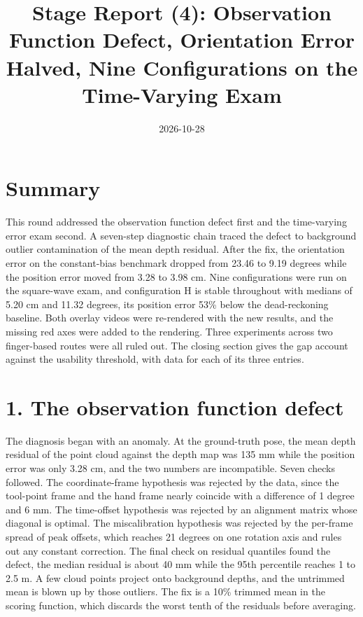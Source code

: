\documentclass{article}
\title{Stage Report (4): Observation Function Defect, Orientation Error Halved, Nine Configurations on the Time-Varying Exam}
\author{}
\date{2026-10-28}
\begin{document}
\maketitle

\section{Summary}
This round addressed the observation function defect first and the time-varying error exam second. A seven-step diagnostic chain traced the defect to background outlier contamination of the mean depth residual. After the fix, the orientation error on the constant-bias benchmark dropped from 23.46 to 9.19 degrees while the position error moved from 3.28 to 3.98 cm. Nine configurations were run on the square-wave exam, and configuration H is stable throughout with medians of 5.20 cm and 11.32 degrees, its position error 53\% below the dead-reckoning baseline. Both overlay videos were re-rendered with the new results, and the missing red axes were added to the rendering. Three experiments across two finger-based routes were all ruled out. The closing section gives the gap account against the usability threshold, with data for each of its three entries.

\section{1. The observation function defect}
The diagnosis began with an anomaly. At the ground-truth pose, the mean depth residual of the point cloud against the depth map was 135 mm while the position error was only 3.28 cm, and the two numbers are incompatible. Seven checks followed. The coordinate-frame hypothesis was rejected by the data, since the tool-point frame and the hand frame nearly coincide with a difference of 1 degree and 6 mm. The time-offset hypothesis was rejected by an alignment matrix whose diagonal is optimal. The miscalibration hypothesis was rejected by the per-frame spread of peak offsets, which reaches 21 degrees on one rotation axis and rules out any constant correction. The final check on residual quantiles found the defect, the median residual is about 40 mm while the 95th percentile reaches 1 to 2.5 m. A few cloud points project onto background depths, and the untrimmed mean is blown up by those outliers. The fix is a 10\% trimmed mean in the scoring function, which discards the worst tenth of the residuals before averaging.
\end{document}
